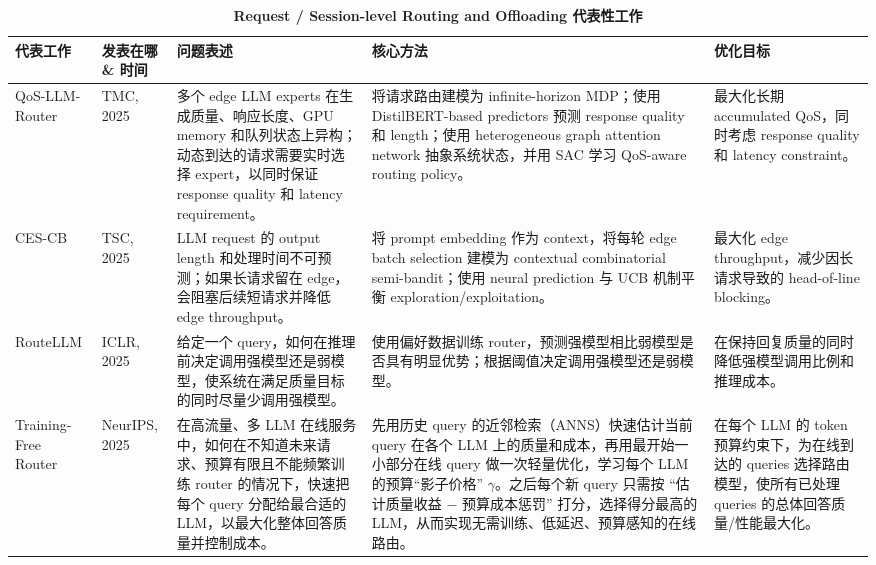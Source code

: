 \begin{table}[!htbp]
    \centering
    \caption{\textbf{Request / Session-level Routing and Offloading 代表性工作}}
    \label{tab:request-session-routing}
    \renewcommand{\arraystretch}{1.45}
    \scriptsize
    \setlength{\tabcolsep}{4pt}
    \begin{tabularx}{\textwidth}{@{}>{\hsize=0.75\hsize\raggedright\arraybackslash}X >{\hsize=0.75\hsize\raggedright\arraybackslash}X >{\hsize=1.15\hsize\raggedright\arraybackslash}X >{\hsize=1.15\hsize\raggedright\arraybackslash}X >{\hsize=1.20\hsize\raggedright\arraybackslash}X@{}}
        \toprule
        \textbf{代表工作} & \textbf{发表在哪 \& 时间} & \textbf{问题表述} & \textbf{核心方法} & \textbf{优化目标} \\
        \midrule
        QoS-LLM-Router \cite{yang2025quality} & TMC, 2025 & 多个 edge LLM experts 在生成质量、响应长度、GPU memory 和队列状态上异构；动态到达的请求需要实时选择 expert，以同时保证 response quality 和 latency requirement。 & 将请求路由建模为 infinite-horizon MDP；使用 DistilBERT-based predictors 预测 response quality 和 length；使用 heterogeneous graph attention network 抽象系统状态，并用 SAC 学习 QoS-aware routing policy。 & 最大化长期 accumulated QoS，同时考虑 response quality 和 latency constraint。 \\
        \tabrowrule
        CES-CB \cite{li2025cloud} & TSC, 2025 & LLM request 的 output length 和处理时间不可预测；如果长请求留在 edge，会阻塞后续短请求并降低 edge throughput。 & 将 prompt embedding 作为 context，将每轮 edge batch selection 建模为 contextual combinatorial semi-bandit；使用 neural prediction 与 UCB 机制平衡 exploration/exploitation。 & 最大化 edge throughput，减少因长请求导致的 head-of-line blocking。 \\
        \tabrowrule
        RouteLLM \cite{ong2024routellm} & ICLR, 2025 & 给定一个 query，如何在推理前决定调用强模型还是弱模型，使系统在满足质量目标的同时尽量少调用强模型。 & 使用偏好数据训练 router，预测强模型相比弱模型是否具有明显优势；根据阈值决定调用强模型还是弱模型。 & 在保持回复质量的同时降低强模型调用比例和推理成本。 \\
        \tabrowrule
        Training-Free Router \cite{wu2026efficient} & NeurIPS, 2025\newline  & 在高流量、多 LLM 在线服务中，如何在不知道未来请求、预算有限且不能频繁训练 router 的情况下，快速把每个 query 分配给最合适的 LLM，以最大化整体回答质量并控制成本。 & 先用历史 query 的近邻检索（ANNS）快速估计当前 query 在各个 LLM 上的质量和成本，再用最开始一小部分在线 query 做一次轻量优化，学习每个 LLM 的预算“影子价格” $\gamma$。之后每个新 query 只需按 “估计质量收益 − 预算成本惩罚” 打分，选择得分最高的 LLM，从而实现无需训练、低延迟、预算感知的在线路由。 & 在每个 LLM 的 token 预算约束下，为在线到达的 queries 选择路由模型，使所有已处理 queries 的总体回答质量/性能最大化。 \\

\end{tabularx}
\end{table}
